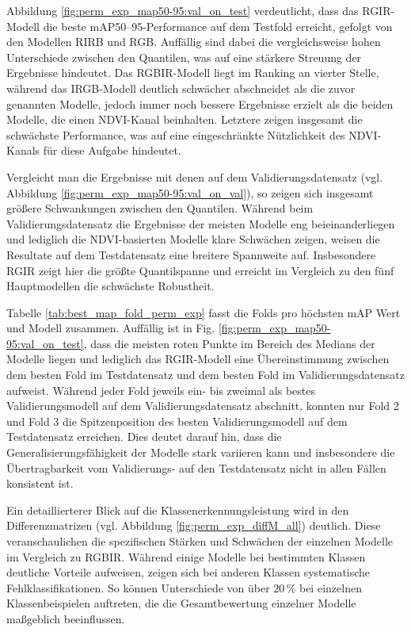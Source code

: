 Abbildung \ref{fig:perm_exp_map50-95:val_on_test} verdeutlicht, dass das RGIR-Modell die beste \acrshort{mAP}50--95-Performance auf dem Testfold erreicht, gefolgt von den Modellen RIRB und RGB. Auffällig sind dabei die vergleichsweise hohen Unterschiede zwischen den Quantilen, was auf eine stärkere Streuung der Ergebnisse hindeutet. Das RGBIR-Modell liegt im Ranking an vierter Stelle, während das IRGB-Modell deutlich schwächer abschneidet als die zuvor genannten Modelle, jedoch immer noch bessere Ergebnisse erzielt als die beiden Modelle, die einen NDVI-Kanal beinhalten. Letztere zeigen insgesamt die schwächste Performance, was auf eine eingeschränkte Nützlichkeit des NDVI-Kanals für diese Aufgabe hindeutet.  

Vergleicht man die Ergebnisse mit denen auf dem Validierungsdatensatz (vgl. Abbildung \ref{fig:perm_exp_map50-95:val_on_val}), so zeigen sich insgesamt größere Schwankungen zwischen den Quantilen. Während beim Validierungsdatensatz die Ergebnisse der meisten Modelle eng beieinanderliegen und lediglich die NDVI-basierten Modelle klare Schwächen zeigen, weisen die Resultate auf dem Testdatensatz eine breitere Spannweite auf. Insbesondere RGIR zeigt hier die größte Quantilspanne und erreicht im Vergleich zu den fünf Hauptmodellen die schwächste Robustheit. 

Tabelle \ref{tab:best_map_fold_perm_exp} fasst die Folds pro höchsten \acrshort{mAP} Wert und Modell zusammen. Auffällig ist in Fig. \ref{fig:perm_exp_map50-95:val_on_test}, dass die meisten roten Punkte im Bereich des Medians der Modelle liegen und lediglich das \acrshort{RGIR}-Modell eine Übereinstimmung zwischen dem besten Fold im Testdatensatz und dem besten Fold im Validierungsdatensatz aufweist.  Während jeder Fold jeweils ein- bis zweimal  als bestes Validierungsmodell auf dem Validierungsdatensatz abschnitt, konnten nur Fold 2 und Fold 3 die Spitzenposition des besten Validierungsmodell auf dem Testdatensatz erreichen.  Dies deutet darauf hin, dass die Generalisierungsfähigkeit der Modelle stark variieren kann und insbesondere die Übertragbarkeit vom Validierungs- auf den Testdatensatz nicht in allen Fällen konsistent ist.  

Ein detaillierterer Blick auf die Klassenerkennungsleistung wird in den Differenzmatrizen (vgl. Abbildung \ref{fig:perm_exp_diffM_all}) deutlich. Diese veranschaulichen die spezifischen Stärken und Schwächen der einzelnen Modelle im Vergleich zu RGBIR. Während einige Modelle bei bestimmten Klassen deutliche Vorteile aufweisen, zeigen sich bei anderen Klassen systematische Fehlklassifikationen. So können Unterschiede von über 20\,\% bei einzelnen Klassenbeispielen auftreten, die die Gesamtbewertung einzelner Modelle maßgeblich beeinflussen.  

